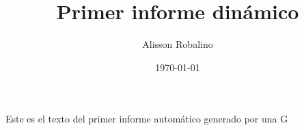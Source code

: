 \documentclass[12pt, a4paper]{book}
\title{Primer informe dinámico}
\author{Alisson Robalino}
\date{\today}
\begin{document}
\maketitle
Este es el texto del primer informe automático generado por una G
\end{document}
